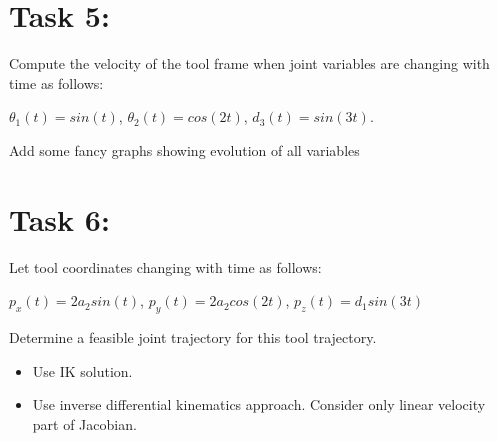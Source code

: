 \documentclass[12pt, a4paper]{report}
\begin{document}
\section*{Task 5:}
Compute the velocity of the tool frame when joint variables are changing with time as follows:

{\centering
$\theta_1(t) = sin(t)$, $\theta_2(t) = cos(2t)$, $d_3(t) = sin(3t)$.
}

Add some fancy graphs showing evolution of all variables



\section*{Task 6:}
Let tool coordinates changing with time as follows:

{\centering
$p_x(t) = 2a_2sin(t)$, $p_y(t) = 2a_2cos(2t)$, $p_z(t) = d_1sin(3t)$
}

Determine a feasible joint trajectory for this tool trajectory.

\begin{itemize}
	\item Use IK solution.
	\item Use inverse differential kinematics approach. Consider only linear
velocity part of Jacobian.
\end{itemize}
\end{document}
